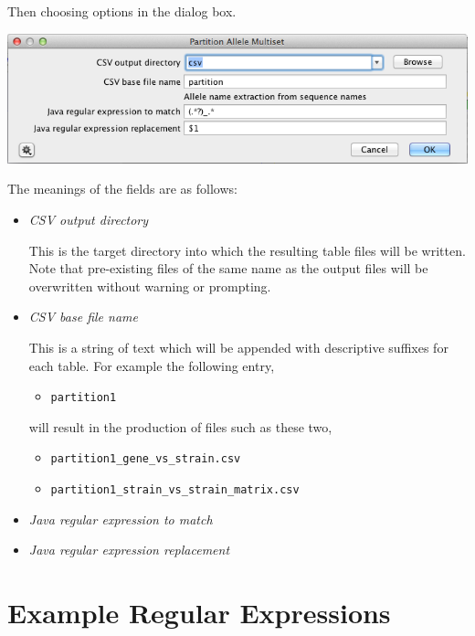 \documentclass[12pt,letterpaper]{article}
\begin{document}
\hfill

Then choosing options in the dialog box.

\hfill

\includegraphics[resolution=130]{dialog_box.png}

\hfill

The meanings of the fields are as follows:

\begin{itemize}
\item \textit{CSV output directory} \hfill \\
    This is the target directory into which the resulting table files will be
    written.  Note that pre-existing files of the same name as the output files
    will be overwritten without warning or prompting.

\item \textit{CSV base file name} \hfill \\
    This is a string of text which will be appended with descriptive suffixes
    for each table.  For example the following entry,
    
    \begin{itemize}
    \item[]\texttt{partition1}
    \end{itemize}

    will result in the production of files such as these two,

    \begin{itemize}
    \item[]\texttt{partition1\_gene\_vs\_strain.csv}
    \item[]\texttt{partition1\_strain\_vs\_strain\_matrix.csv}
    \end{itemize}

\item \textit{Java regular expression to match} \hfill \\

\item \textit{Java regular expression replacement} \hfill \\

\end{itemize}

\section{Example Regular Expressions}
\end{document}
